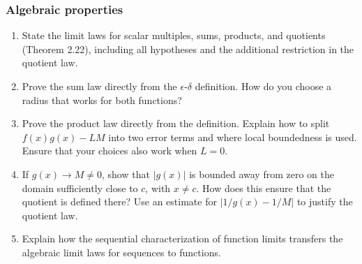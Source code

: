\subsubsection*{Algebraic properties}
\begin{enumerate}[resume]
  \item State the limit laws for scalar multiples, sums, products,
    and quotients (Theorem 2.22), including all hypotheses and the
    additional restriction in the quotient law.

  \item Prove the sum law directly from the \(\epsilon\)-\(\delta\)
    definition. How do you choose a radius that works for both functions?

  \item Prove the product law directly from the definition.
    Explain how to split \(f(x)g(x)-LM\) into two error terms and
    where local boundedness is used. Ensure that your choices also
    work when \(L=0\).

  \item If \(g(x)\to M\ne0\), show that \(|g(x)|\) is bounded
    away from zero on the domain sufficiently close to \(c\), with
    \(x\ne c\). How does this ensure that the quotient is defined
    there? Use an estimate for \(|1/g(x)-1/M|\) to justify the quotient law.

  \item Explain how the sequential characterization of function limits
    transfers the algebraic limit laws for sequences to functions.
\end{enumerate}


